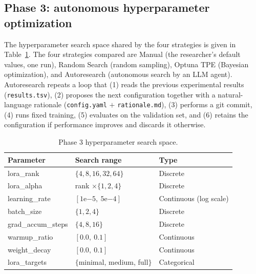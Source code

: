 \subsection{Phase 3: autonomous hyperparameter optimization}
\label{sec:phase3}

The hyperparameter search space shared by the four strategies is given in
Table~\ref{tab:searchspace}. The four strategies compared are Manual (the
researcher's default values, one run), Random Search (random sampling), Optuna
TPE (Bayesian optimization), and Autoresearch (autonomous search by an LLM
agent). Autoresearch repeats a loop that (1) reads the previous experimental
results (\texttt{results.tsv}), (2) proposes the next configuration together with
a natural-language rationale (\texttt{config.yaml} $+$ \texttt{rationale.md}),
(3) performs a git commit, (4) runs fixed training, (5) evaluates on the
validation set, and (6) retains the configuration if performance improves and
discards it otherwise.

\begin{table}[t]
\centering
\caption{Phase 3 hyperparameter search space.}
\label{tab:searchspace}
\small
\begin{tabular}{@{}lll@{}}
\toprule
Parameter & Search range & Type \\
\midrule
lora\_rank        & $\{4, 8, 16, 32, 64\}$        & Discrete \\
lora\_alpha       & rank $\times \{1, 2, 4\}$     & Discrete \\
learning\_rate    & $[1\mathrm{e}{-5},\ 5\mathrm{e}{-4}]$ & Continuous (log scale) \\
batch\_size       & $\{1, 2, 4\}$                 & Discrete \\
grad\_accum\_steps & $\{4, 8, 16\}$               & Discrete \\
warmup\_ratio     & $[0.0,\ 0.1]$                 & Continuous \\
weight\_decay     & $[0.0,\ 0.1]$                 & Continuous \\
lora\_targets     & $\{$minimal, medium, full$\}$ & Categorical \\
\bottomrule
\end{tabular}
\end{table}

